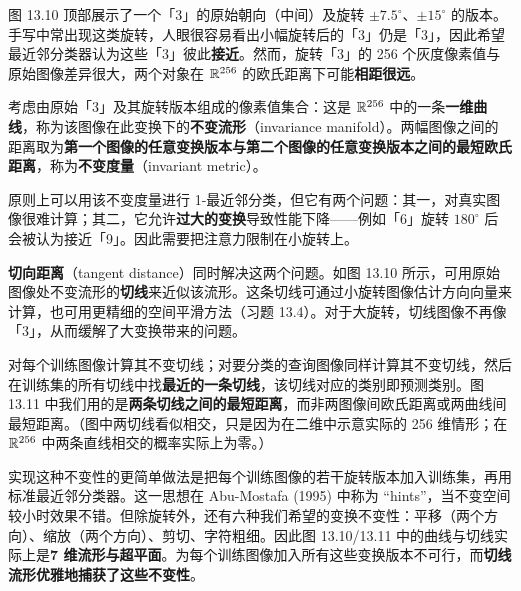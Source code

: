 图 13.10 顶部展示了一个「3」的原始朝向（中间）及旋转 $\pm 7.5^\circ$、$\pm 15^\circ$ 的版本。手写中常出现这类旋转，人眼很容易看出小幅旋转后的「3」仍是「3」，因此希望最近邻分类器认为这些「3」彼此\textbf{接近}。然而，旋转「3」的 256 个灰度像素值与原始图像差异很大，两个对象在 $\mathbb{R}^{256}$ 的欧氏距离下可能\textbf{相距很远}。

\begin{definition}[不变流形与不变度量]
考虑由原始「3」及其旋转版本组成的像素值集合：这是 $\mathbb{R}^{256}$ 中的一条\textbf{一维曲线}，称为该图像在此变换下的\textbf{不变流形}（invariance manifold）。两幅图像之间的距离取为\textbf{第一个图像的任意变换版本与第二个图像的任意变换版本之间的最短欧氏距离}，称为\textbf{不变度量}（invariant metric）。
\end{definition}

\begin{remark}[不变度量的两个问题]
原则上可以用该不变度量进行 1-最近邻分类，但它有两个问题：其一，对真实图像很难计算；其二，它允许\textbf{过大的变换}导致性能下降——例如「6」旋转 $180^\circ$ 后会被认为接近「9」。因此需要把注意力限制在小旋转上。
\end{remark}

\textbf{切向距离}（tangent distance）同时解决这两个问题。如图 13.10 所示，可用原始图像处不变流形的\textbf{切线}来近似该流形。这条切线可通过小旋转图像估计方向向量来计算，也可用更精细的空间平滑方法（习题 13.4）。对于大旋转，切线图像不再像「3」，从而缓解了大变换带来的问题。

\begin{definition}[切向距离分类]
对每个训练图像计算其不变切线；对要分类的查询图像同样计算其不变切线，然后在训练集的所有切线中找\textbf{最近的一条切线}，该切线对应的类别即预测类别。图 13.11 中我们用的是\textbf{两条切线之间的最短距离}，而非两图像间欧氏距离或两曲线间最短距离。（图中两切线看似相交，只是因为在二维中示意实际的 256 维情形；在 $\mathbb{R}^{256}$ 中两条直线相交的概率实际上为零。）
\end{definition}

\begin{remark}
实现这种不变性的更简单做法是把每个训练图像的若干旋转版本加入训练集，再用标准最近邻分类器。这一思想在 Abu-Mostafa (1995) 中称为 ``hints''，当不变空间较小时效果不错。但除旋转外，还有六种我们希望的变换不变性：平移（两个方向）、缩放（两个方向）、剪切、字符粗细。因此图 13.10/13.11 中的曲线与切线实际上是\textbf{7 维流形与超平面}。为每个训练图像加入所有这些变换版本不可行，而\textbf{切线流形优雅地捕获了这些不变性}。
\end{remark}

